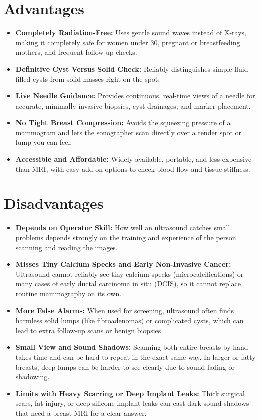 \section{Advantages}
\begin{itemize}
\item \textbf{Completely Radiation-Free:} Uses gentle sound waves instead of X-rays, making it completely safe for women under 30, pregnant or breastfeeding mothers, and frequent follow-up checks.
\item \textbf{Definitive Cyst Versus Solid Check:} Reliably distinguishes simple fluid-filled cysts from solid masses right on the spot.
\item \textbf{Live Needle Guidance:} Provides continuous, real-time views of a needle for accurate, minimally invasive biopsies, cyst drainages, and marker placement.
\item \textbf{No Tight Breast Compression:} Avoids the squeezing pressure of a mammogram and lets the sonographer scan directly over a tender spot or lump you can feel.
\item \textbf{Accessible and Affordable:} Widely available, portable, and less expensive than MRI, with easy add-on options to check blood flow and tissue stiffness.
\end{itemize}

\section{Disadvantages}
\begin{itemize}
\item \textbf{Depends on Operator Skill:} How well an ultrasound catches small problems depends strongly on the training and experience of the person scanning and reading the images.
\item \textbf{Misses Tiny Calcium Specks and Early Non-Invasive Cancer:} Ultrasound cannot reliably see tiny calcium specks (microcalcifications) or many cases of early ductal carcinoma in situ (DCIS), so it cannot replace routine mammography on its own.
\item \textbf{More False Alarms:} When used for screening, ultrasound often finds harmless solid lumps (like fibroadenomas) or complicated cysts, which can lead to extra follow-up scans or benign biopsies.
\item \textbf{Small View and Sound Shadows:} Scanning both entire breasts by hand takes time and can be hard to repeat in the exact same way. In larger or fatty breasts, deep lumps can be harder to see clearly due to sound fading or shadowing.
\item \textbf{Limits with Heavy Scarring or Deep Implant Leaks:} Thick surgical scars, fat injury, or deep silicone implant leaks can cast dark sound shadows that need a breast MRI for a clear answer.
\end{itemize}


